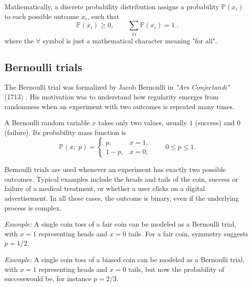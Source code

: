 \medskip

Mathematically, a discrete probability distribution assigns a probability $\mathbb{P}(x_i)$ to each possible outcome $x_i$, such that
\begin{equation}
    \mathbb{P}(x_i)\ge 0, \qquad \sum_{\forall i} \mathbb{P}(x_i) = 1 \; .
\end{equation}
where the $\forall$ symbol is just a mathematical character meaning "for all".

\subsection{Bernoulli trials}

The Bernoulli trial was formalized by Jacob Bernoulli in \textit{"Ars Conjectandi"} (1713) \cite{bernoulli_1713_ars}. His motivation was to understand how regularity emerges from randomness when an experiment with two outcomes is repeated many times.

\medskip

A Bernoulli random variable $x$ takes only two values, usually $1$ (success) and $0$ (failure). Its probability mass function is
\begin{equation}
    \mathbb{P}(x; \; p) = 
    \begin{cases}
        p, & x=1,\\
        1-p, & x=0,
    \end{cases} \qquad 0\le p\le 1.
    \label{dist_bernoulli}
\end{equation}

Bernoulli trials are used whenever an experiment has exactly two possible outcomes. Typical examples include the heads and tails of the coin, success or failure of a medical treatment, or whether a user clicks on a digital advertisement. In all these cases, the outcome is binary, even if the underlying process is complex.

\medskip

\textit{Example:} A single coin toss of a fair coin can be modeled as a Bernoulli trial, with $x=1$ representing heads and $x=0$ tails. For a fair coin, symmetry suggests $p=1/2$.

\medskip

\textit{Example:} A single coin toss of a biased coin can be modeled as a Bernoulli trial, with $x=1$ representing heads and $x=0$ tails, but now the probability of successwould be, for instance $p=2/3$.


